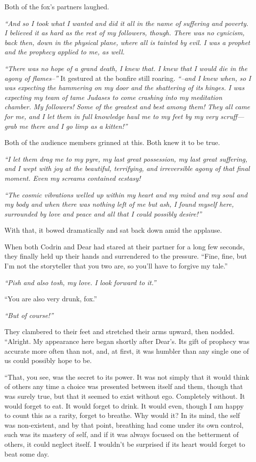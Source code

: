 Both of the fox's partners laughed.

\emph{``And so I took what I wanted and did it all in the name of suffering and poverty. I believed it as hard as the rest of my followers, though. There was no cynicism, back then, down in the physical plane, where all is tainted by evil. I was a prophet and the prophecy applied to me, as well.}

\emph{``There was no hope of a grand death, I knew that. I knew that I would die in the agony of flames--''} It gestured at the bonfire still roaring. \emph{``--and I knew when, so I was expecting the hammering on my door and the shattering of its hinges. I was expecting my team of tame Judases to come crashing into my meditation chamber. My followers! Some of the greatest and best among them! They all came for me, and I let them in full knowledge haul me to my feet by my very scruff---grab me there and I go limp as a kitten!''}

Both of the audience members grinned at this. Both knew it to be true.

\emph{``I let them drag me to my pyre, my last great possession, my last great suffering, and I wept with joy at the beautiful, terrifying, and irreversible agony of that final moment. Even my screams contained ecstasy!}

\emph{``The cosmic vibrations welled up within my heart and my mind and my soul and my body and when there was nothing left of me but ash, I found myself here, surrounded by love and peace and all that I could possibly desire!''}

With that, it bowed dramatically and sat back down amid the applause.

When both Codrin and Dear had stared at their partner for a long few seconds, they finally held up their hands and surrendered to the pressure. ``Fine, fine, but I'm not the storyteller that you two are, so you'll have to forgive my tale.''

\emph{``Pish and also tosh, my love. I look forward to it.''}

``You are also very drunk, fox.''

\emph{``But of course!''}

They clambered to their feet and stretched their arms upward, then nodded. ``Alright. My appearance here began shortly after Dear's. Its gift of prophecy was accurate more often than not, and, at first, it was humbler than any single one of us could possibly hope to be.

``That, you see, was the secret to its power. It was not simply that it would think of others any time a choice was presented between itself and them, though that was surely true, but that it seemed to exist without ego. Completely without. It would forget to eat. It would forget to drink. It would even, though I am happy to count this as a rarity, forget to breathe. Why would it? In its mind, the self was non-existent, and by that point, breathing had come under its own control, such was its mastery of self, and if it was always focused on the betterment of others, it could neglect itself. I wouldn't be surprised if its heart would forget to beat some day.

